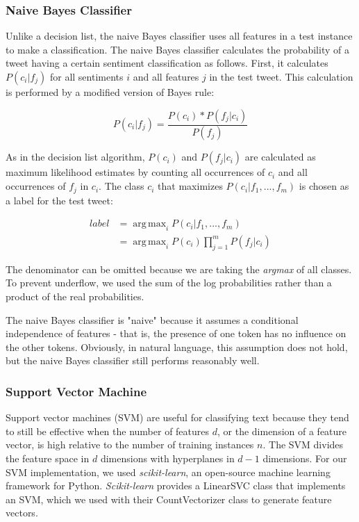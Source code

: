 \documentclass[11pt,letterpaper]{article}
\DeclareMathOperator*{\argmax}{arg\,max}
\begin{document}
\subsubsection{Naive Bayes Classifier}
Unlike a decision list, the naive Bayes classifier uses all features in a test instance to make a classification. The naive Bayes classifier calculates the probability of a tweet having a certain sentiment classification as follows. First, it calculates $P(c_i|f_j)$ for all sentiments $i$ and all features $j$ in the test tweet. This calculation is performed by a modified version of Bayes rule:

\begin{equation}
P(c_i|f_j) = \frac{P(c_i) * P(f_j|c_i)}{P(f_j)}
\end{equation}

As in the decision list algorithm, $P(c_i)$ and $P(f_j|c_i)$ are calculated as maximum likelihood estimates by counting all occurrences of $c_i$ and all occurrences of $f_j$ in $c_i$. The class $c_i$ that maximizes $P(c_i|f_1,...,f_m)$ is chosen as a label for the test tweet:

\begin{align*}
label &= \argmax_i P(c_i|f_1,...,f_m) \\
&= \argmax_i P(c_i) \prod_{j=1}^{m} P(f_j|c_i) \label{eqn}
\end{align*}

The denominator can be omitted because we are taking the \textit{argmax} of all classes. To prevent underflow, we used the sum of the log probabilities rather than a product of the real probabilities. 

The naive Bayes classifier is "naive" because it assumes a conditional independence of features - that is, the presence of one token has no influence on the other tokens. Obviously, in natural language, this assumption does not hold, but the naive Bayes classifier still performs reasonably well. 

\subsubsection{Support Vector Machine}
Support vector machines (SVM) are useful for classifying text because they tend to still be effective when the number of features $d$, or the dimension of a feature vector, is high relative to the number of training instances $n$. The SVM divides the feature space in $d$ dimensions with hyperplanes in $d-1$ dimensions. For our SVM implementation, we used \textit{scikit-learn}, an open-source machine learning framework for Python. \textit{Scikit-learn} provides a LinearSVC class that implements an SVM, which we used with their CountVectorizer class to generate feature vectors.
\end{document}
